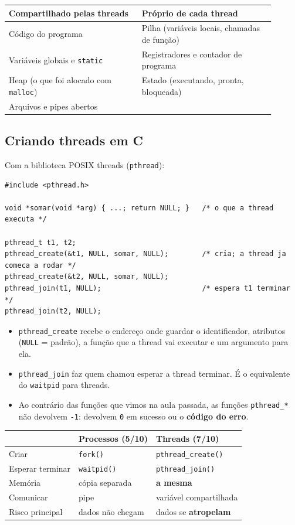 \documentclass[11pt,a4paper]{article}
\newcommand{\cmd}[1]{\texttt{#1}}
\begin{document}
\begin{center}
\begin{tabular}{@{}R{0.45\linewidth}R{0.45\linewidth}@{}}
\toprule
\textbf{Compartilhado pelas threads} & \textbf{Próprio de cada thread} \\
\midrule
Código do programa & Pilha (variáveis locais, chamadas de função) \\
Variáveis globais e \cmd{static} & Registradores e contador de programa \\
Heap (o que foi alocado com \cmd{malloc}) & Estado (executando, pronta, bloqueada) \\
Arquivos e pipes abertos & \\
\bottomrule
\end{tabular}
\end{center}

\subsection{Criando threads em C}

Com a biblioteca POSIX threads (\cmd{pthread}):

\begin{lstlisting}[style=codigo]
#include <pthread.h>

void *somar(void *arg) { ...; return NULL; }   /* o que a thread executa */

pthread_t t1, t2;
pthread_create(&t1, NULL, somar, NULL);        /* cria; a thread ja comeca a rodar */
pthread_create(&t2, NULL, somar, NULL);
pthread_join(t1, NULL);                        /* espera t1 terminar */
pthread_join(t2, NULL);
\end{lstlisting}

\begin{itemize}
    \item \cmd{pthread\_create} recebe o endereço onde guardar o identificador, atributos (\cmd{NULL} = padrão), a função que a thread vai executar e um argumento para ela.
    \item \cmd{pthread\_join} faz quem chamou esperar a thread terminar. É o equivalente do \cmd{waitpid} para threads.
    \item Ao contrário das funções que vimos na aula passada, as funções \cmd{pthread\_*} não devolvem \cmd{-1}: devolvem \cmd{0} em sucesso ou o \textbf{código do erro}.
\end{itemize}

\begin{center}
\begin{tabular}{@{}lll@{}}
\toprule
& \textbf{Processos (5/10)} & \textbf{Threads (7/10)} \\
\midrule
Criar & \cmd{fork()} & \cmd{pthread\_create()} \\
Esperar terminar & \cmd{waitpid()} & \cmd{pthread\_join()} \\
Memória & cópia separada & \textbf{a mesma} \\
Comunicar & pipe & variável compartilhada \\
Risco principal & dados não chegam & dados se \textbf{atropelam} \\
\bottomrule
\end{tabular}
\end{center}
\end{document}

